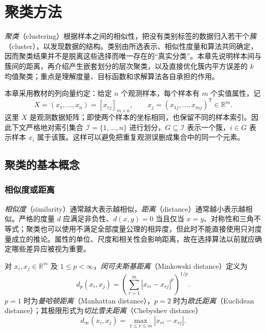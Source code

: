 \setcounter{chapter}{13} %
\chapter{聚类方法}
\label{ch:lh-clustering}

\emph{聚类}（clustering）根据样本之间的相似性，把没有类别标签的数据归入若干个\emph{簇}（cluster），以发现数据的结构。类别由所选表示、相似性度量和算法共同确定，因而聚类结果并不是脱离这些选择而唯一存在的“真实分类”。本章先说明样本间与簇间的距离，再介绍产生嵌套划分的层次聚类，以及直接优化簇内平方误差的 $k$ 均值聚类；重点是理解度量、目标函数和求解算法各自承担的作用。

本章采用教材的列向量约定：给定 $n$ 个观测样本，每个样本有 $m$ 个实值属性，记
\begin{equation}
X=(x_1,\ldots,x_n)=[x_{rj}]_{m\times n},\qquad
x_j=(x_{1j},\ldots,x_{mj})^{\mathsf T}\in\mathbb R^m.
\label{eq:lh-cluster-data}
\end{equation}
这里 $X$ 是观测数据矩阵；即使两个样本的坐标相同，也保留不同的样本索引。因此下文严格地对索引集合 $\mathcal I=\{1,\ldots,n\}$ 进行划分，$G\subseteq\mathcal I$ 表示一个簇，$i\in G$ 表示样本 $x_i$ 属于该簇。这样可以避免把重复观测误删成集合中的同一个元素。

\section{聚类的基本概念}
\label{sec:lh-cluster-basics}

\subsection{相似度或距离}
\label{subsec:lh-cluster-similarity}

\emph{相似度}（similarity）通常越大表示越相似，\emph{距离}（distance）通常越小表示越相似。严格的度量 $d$ 应满足非负性、$d(x,y)=0$ 当且仅当 $x=y$、对称性和三角不等式；聚类也可以使用不满足全部度量公理的相异度，但此时不能直接使用只对度量成立的推论。属性的单位、尺度和相关性会影响距离，故在选择算法以前就应确定哪些差异应被视为重要。

\begin{definition}[闵可夫斯基距离]
\label{def:lh-cluster-minkowski}
对 $x_i,x_j\in\mathbb R^m$ 及 $1\leq p<\infty$，\emph{闵可夫斯基距离}（Minkowski distance）定义为
\begin{equation}
d_p(x_i,x_j)=\left(\sum_{r=1}^m|x_{ri}-x_{rj}|^p\right)^{1/p}.
\label{eq:lh-cluster-minkowski}
\end{equation}
$p=1$ 时为\emph{曼哈顿距离}（Manhattan distance），$p=2$ 时为\emph{欧氏距离}（Euclidean distance）；其极限形式为\emph{切比雪夫距离}（Chebyshev distance）
\begin{equation}
d_\infty(x_i,x_j)=\max_{1\leq r\leq m}|x_{ri}-x_{rj}|.
\label{eq:lh-cluster-chebyshev}
\end{equation}
\end{definition}

